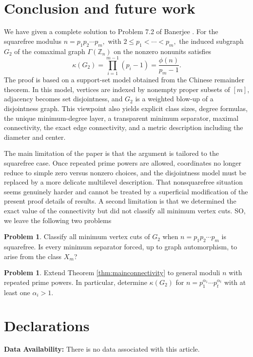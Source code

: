 \documentclass[12pt]{article}
\theoremstyle{definition}
\newtheorem{problem}[theorem]{Problem}
\begin{document}
	\section{Conclusion and future work}\label{sec:conclusion}
	
	We have given a complete solution to Problem 7.2 of Banerjee \cite{Banerjee2022}. For the squarefree modulus $ n=p_1p_2\cdots p_m,$ with $2\leq p_1<\cdots<p_m, $ the induced subgraph $G_2$ of the comaximal graph $\Gamma(\mathbb Z_n)$ on the nonzero nonunits satisfies
	$$
	\kappa(G_2)=\prod_{i=1}^{m-1}(p_i-1)=\frac{\phi(n)}{p_m-1}.
	$$
	The proof is based on a support-set model obtained from the Chinese remainder theorem. In this model, vertices are indexed by nonempty proper subsets of $[m]$, adjacency becomes set disjointness, and $G_2$ is a weighted blow-up of a disjointness graph. This viewpoint also yields explicit class sizes, degree formulas, the unique minimum-degree layer, a transparent minimum separator, maximal connectivity, the exact edge connectivity, and a metric description including the diameter and center.
	
	The main limitation of the paper is that the argument is tailored to the squarefree case. Once repeated prime powers are allowed, coordinates no longer reduce to simple zero versus nonzero choices, and the disjointness model must be replaced by a more delicate multilevel description. That nonsquarefree situation seems genuinely harder and cannot be treated by a superficial modification of the present proof details of results. A second limitation is that we determined the exact value of the connectivity but did not classify all minimum vertex cuts. SO, we leave the following two problems
	
	\begin{problem}
		Classify all minimum vertex cuts of $G_2$ when $n=p_1p_2\cdots p_m$ is squarefree. Is every minimum separator forced, up to graph automorphism, to arise from the class $X_{{m}}$?
	\end{problem}
	
	\begin{problem}
		Extend Theorem \ref{thm:mainconnectivity} to general moduli $n$ with repeated prime powers. In particular, determine $\kappa(G_2)$ for $n=p_1^{\alpha_1}\cdots p_t^{\alpha_t}$ with at least one $\alpha_i>1$.
	\end{problem}
	
	\section*{Declarations}
	\noindent \textbf{Data Availability:} There is no data associated with this article.
	
\end{document}
